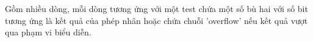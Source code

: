 Gồm nhiều dòng, mỗi dòng tương ứng với một test chứa một số bù hai với số bit tương ứng là kết quả của phép nhân hoặc chứa chuỗi 'overflow' nếu kết quả vượt qua phạm vi biểu diễn.